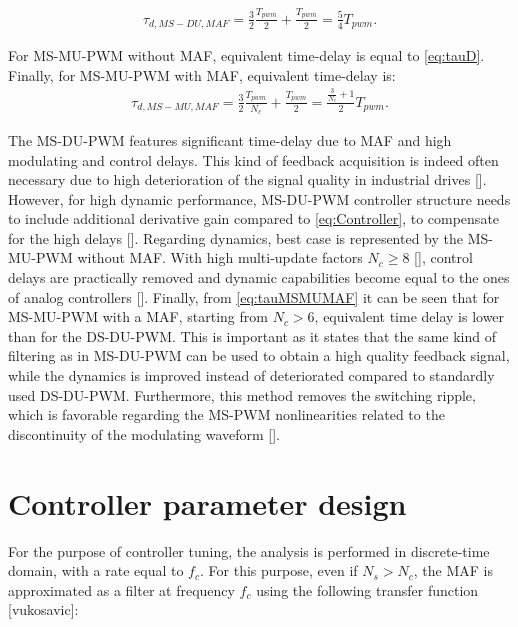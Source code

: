 \documentclass[journal]{IEEEtran}
\begin{document}
\begin{equation}
\begin{aligned}
\tau_{d,MS-DU,MAF} = \frac{3}{2} \frac{T_{pwm}}{2} + \frac{T_{pwm}}{2} = \frac{5}{4} T_{pwm}.
\label{eq:tauMSDU} 
\end{aligned}    
\end{equation}

For MS-MU-PWM without MAF, equivalent time-delay is equal to \eqref{eq:tauD}.
Finally, for MS-MU-PWM with MAF, equivalent time-delay is:
\begin{equation}
\begin{aligned}
\tau_{d,MS-MU,MAF} = \frac{3}{2} \frac{T_{pwm}}{N_c} + \frac{T_{pwm}}{2} = \frac{\frac{3}{N_c}+1}{2}T_{pwm}.
\label{eq:tauMSMUMAF} 
\end{aligned}    
\end{equation}

The MS-DU-PWM features significant time-delay due to MAF and high modulating and control delays. This kind of feedback acquisition is indeed often necessary due to high deterioration of the signal quality in industrial drives []. However, for high dynamic performance, MS-DU-PWM controller structure needs to include additional derivative gain compared to \eqref{eq:Controller}, to compensate for the high delays []. Regarding dynamics, best case is represented by the MS-MU-PWM without MAF. With high multi-update factors $N_c \geq 8$ [], control delays are practically removed and dynamic capabilities become equal to the ones of analog controllers [].
Finally, from \eqref{eq:tauMSMUMAF} it can be seen that for MS-MU-PWM with a MAF, starting from $N_c>6$, equivalent time delay is lower than for the DS-DU-PWM. This is important as it states that the same kind of filtering as in MS-DU-PWM can be used to obtain a high quality feedback signal, while the dynamics is improved instead of deteriorated compared to standardly used DS-DU-PWM. Furthermore, this method removes the switching ripple, which is favorable regarding the MS-PWM nonlinearities related to the discontinuity of the modulating waveform []. 

\section{Controller parameter design}
For the purpose of controller tuning, the analysis is performed in discrete-time domain, with a rate equal to $f_c$. For this purpose, even if $N_s > N_c$, the MAF is approximated as a filter at frequency $f_c$ using the following transfer function [vukosavic]:
\end{document}
